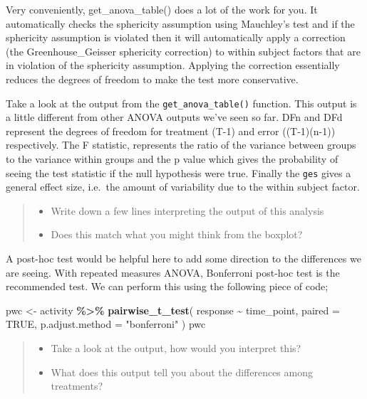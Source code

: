 \documentclass[
]{book}
\newenvironment{Shaded}{\begin{snugshade}}{\end{snugshade}}
\newcommand{\AttributeTok}[1]{\textcolor[rgb]{0.13,0.29,0.53}{#1}}
\newcommand{\ConstantTok}[1]{\textcolor[rgb]{0.56,0.35,0.01}{#1}}
\newcommand{\FunctionTok}[1]{\textcolor[rgb]{0.13,0.29,0.53}{\textbf{#1}}}
\newcommand{\NormalTok}[1]{#1}
\newcommand{\OtherTok}[1]{\textcolor[rgb]{0.56,0.35,0.01}{#1}}
\newcommand{\SpecialCharTok}[1]{\textcolor[rgb]{0.81,0.36,0.00}{\textbf{#1}}}
\newcommand{\StringTok}[1]{\textcolor[rgb]{0.31,0.60,0.02}{#1}}
\providecommand{\tightlist}{%
  \setlength{\itemsep}{0pt}\setlength{\parskip}{0pt}}
\begin{document}
Very conveniently, get\_anova\_table() does a lot of the work for you. It automatically checks the sphericity assumption using Mauchley's test and if the sphericity assumption is violated then it will automatically apply a correction (the Greenhouse\_Geisser sphericity correction) to within subject factors that are in violation of the sphericity assumption. Applying the correction essentially reduces the degrees of freedom to make the test more conservative.

Take a look at the output from the \texttt{get\_anova\_table()} function. This output is a little different from other ANOVA outputs we've seen so far. DFn and DFd represent the degrees of freedom for treatment (T-1) and error ((T-1)(n-1)) respectively. The F statistic, represents the ratio of the variance between groups to the variance within groups and the p value which gives the probability of seeing the test statistic if the null hypothesis were true. Finally the \texttt{ges} gives a general effect size, i.e.~the amount of variability due to the within subject factor.

\begin{quote}
\begin{itemize}
\tightlist
\item
  Write down a few lines interpreting the output of this analysis
\item
  Does this match what you might think from the boxplot?
\end{itemize}
\end{quote}

A post-hoc test would be helpful here to add some direction to the differences we are seeing. With repeated measures ANOVA, Bonferroni post-hoc test is the recommended test. We can perform this using the following piece of code;

\begin{Shaded}
\begin{Highlighting}[]
\NormalTok{pwc }\OtherTok{\textless{}{-}}\NormalTok{ activity }\SpecialCharTok{\%\textgreater{}\%}
  \FunctionTok{pairwise\_t\_test}\NormalTok{(}
\NormalTok{    response }\SpecialCharTok{\textasciitilde{}}\NormalTok{ time\_point, }\AttributeTok{paired =} \ConstantTok{TRUE}\NormalTok{,}
    \AttributeTok{p.adjust.method =} \StringTok{"bonferroni"}
\NormalTok{  )}
\NormalTok{pwc}
\end{Highlighting}
\end{Shaded}

\begin{quote}
\begin{itemize}
\tightlist
\item
  Take a look at the output, how would you interpret this?
\item
  What does this output tell you about the differences among treatments?
\end{itemize}
\end{quote}
\end{document}
